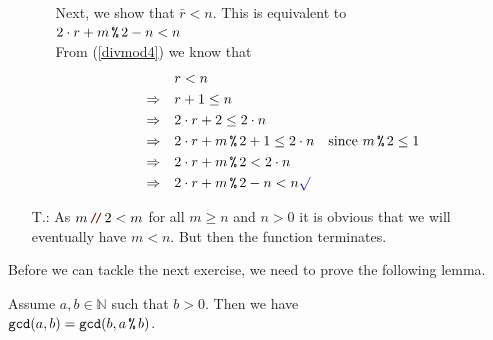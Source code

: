 \begin{enumerate}
\begin{enumerate}
    Next, we show that $\bar{r} < n$. This is equivalent to
    \\[0.2cm]
    \hspace*{1.3cm}
    $2 \cdot r + m \mmod 2 - n < n$
    \\[0.2cm]
    From (\ref{divmod4}) we know that
    \begin{align*}
                       & r < n \\
      \Rightarrow\quad & r + 1 \leq n \\
      \Rightarrow\quad & 2 \cdot r + 2 \leq 2 \cdot n \\
      \Rightarrow\quad & 2 \cdot r + m \mmod 2 + 1 \leq 2 \cdot n \quad \mbox{since $m \mmod 2 \leq 1$} \\
      \Rightarrow\quad & 2 \cdot r + m \mmod 2 < 2 \cdot n \\
      \Rightarrow\quad & 2 \cdot r + m \mmod 2 - n < n \green{\surd}
    \end{align*}
  \end{enumerate}
\item[T.:] As $m \dv 2 < m$ for all $m \geq n$ and $n > 0$ it is obvious that we will eventually have
  $m  < n$. But then the function  terminates.
\end{enumerate}

Before we can tackle the next exercise, we need to prove the following lemma.
\begin{Lemma}[Euclid]
  Assume $a, b \in \mathbb{N}$ such that $b > 0$.  Then we have
  \\[0.2cm]
  \hspace*{1.3cm}
  $\mathtt{gcd}(a, b) = \mathtt{gcd}(b, a \,\texttt{\%}\, b)$.
\end{Lemma}

